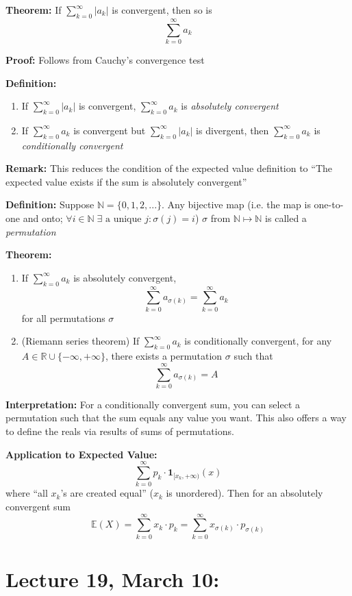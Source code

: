 \documentclass[12pt]{article}
\newcommand{\R}{\mathbb{R}}
\begin{document}
\textbf{Theorem:} If $\sum_{k=0}^\infty |a_k|$ is convergent, then so is 
\[\sum_{k=0}^\infty a_k\]

\textbf{Proof:} Follows from Cauchy's convergence test

\textbf{Definition:} 
\begin{enumerate}
    \item If $\sum_{k=0}^\infty |a_k|$ is convergent, $\sum_{k=0}^\infty a_k$ is \emph{absolutely convergent}
    \item If $\sum_{k=0}^\infty a_k$ is convergent but $\sum_{k=0}^\infty |a_k|$ is divergent, then $\sum_{k=0}^\infty a_k$ is \emph{conditionally convergent}
\end{enumerate}
\textbf{Remark:} This reduces the condition of the expected value definition to ``The expected value exists if the sum is absolutely convergent''

\textbf{Definition:} Suppose $\mathbb{N} = \{0, 1, 2, ...\}$. Any bijective map (i.e. the map is one-to-one and onto; $\forall i \in \mathbb{N} \; \exists \text{ a unique } j: \sigma(j) = i$) $\sigma$ from $\mathbb{N} \mapsto \mathbb{N}$ is called a \emph{permutation}

\textbf{Theorem:} 
\begin{enumerate}
    \item If $\sum_{k=0}^\infty a_k$ is absolutely convergent, 
    \[\sum_{k=0}^\infty a_{\sigma(k)} = \sum_{k=0}^\infty a_k\]
    for all permutations $\sigma$
    \item (Riemann series theorem) If $\sum_{k=0}^\infty a_k$ is conditionally convergent, for any $A \in \R\cup\{-\infty, +\infty\}$, there exists a permutation $\sigma$ such that 
    \[\sum_{k=0}^\infty a_{\sigma(k)} = A\]
\end{enumerate}

\textbf{Interpretation:} For a conditionally convergent sum, you can select a permutation such that the sum equals any value you want. This also offers a way to define the reals via results of sums of permutations.

\textbf{Application to Expected Value:}
\[\sum_{k=0}^\infty p_k \cdot \mathbf{1}_{[x_k, +\infty)}(x)\]
where ``all $x_k$'s are created equal'' ($x_k$ is unordered). Then for an absolutely convergent sum
\[\mathbb{E}(X) = \sum_{k=0}^\infty x_k \cdot p_k = \sum_{k=0}^\infty x_{\sigma(k)} \cdot p_{\sigma (k)}\]

\section*{Lecture 19, March 10:}
\end{document}
